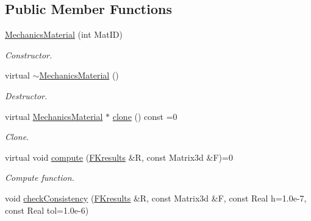 \subsection*{Public Member Functions}
\begin{DoxyCompactItemize}
\item 
\hypertarget{classvoom_1_1_mechanics_material_a8ada87cbee671983effd741dec424536}{
\hyperlink{classvoom_1_1_mechanics_material_a8ada87cbee671983effd741dec424536}{MechanicsMaterial} (int MatID)}
\label{classvoom_1_1_mechanics_material_a8ada87cbee671983effd741dec424536}

\begin{DoxyCompactList}\small\item\em Constructor. \item\end{DoxyCompactList}\item 
\hypertarget{classvoom_1_1_mechanics_material_a885bf927f6480ff577d6934c8272e832}{
virtual \hyperlink{classvoom_1_1_mechanics_material_a885bf927f6480ff577d6934c8272e832}{$\sim$MechanicsMaterial} ()}
\label{classvoom_1_1_mechanics_material_a885bf927f6480ff577d6934c8272e832}

\begin{DoxyCompactList}\small\item\em Destructor. \item\end{DoxyCompactList}\item 
\hypertarget{classvoom_1_1_mechanics_material_a443b8bae4637df4dcb049185ea272962}{
virtual \hyperlink{classvoom_1_1_mechanics_material}{MechanicsMaterial} $\ast$ \hyperlink{classvoom_1_1_mechanics_material_a443b8bae4637df4dcb049185ea272962}{clone} () const =0}
\label{classvoom_1_1_mechanics_material_a443b8bae4637df4dcb049185ea272962}

\begin{DoxyCompactList}\small\item\em Clone. \item\end{DoxyCompactList}\item 
\hypertarget{classvoom_1_1_mechanics_material_a0a78cf77ca39a636e8e2d46f4b141f48}{
virtual void \hyperlink{classvoom_1_1_mechanics_material_a0a78cf77ca39a636e8e2d46f4b141f48}{compute} (\hyperlink{structvoom_1_1_mechanics_material_1_1_f_kresults}{FKresults} \&R, const Matrix3d \&F)=0}
\label{classvoom_1_1_mechanics_material_a0a78cf77ca39a636e8e2d46f4b141f48}

\begin{DoxyCompactList}\small\item\em Compute function. \item\end{DoxyCompactList}\item 
\hypertarget{classvoom_1_1_mechanics_material_a605d5ba240e3ef64b1a30599f48db6db}{
void \hyperlink{classvoom_1_1_mechanics_material_a605d5ba240e3ef64b1a30599f48db6db}{checkConsistency} (\hyperlink{structvoom_1_1_mechanics_material_1_1_f_kresults}{FKresults} \&R, const Matrix3d \&F, const Real h=1.0e-\/7, const Real tol=1.0e-\/6)}
\label{classvoom_1_1_mechanics_material_a605d5ba240e3ef64b1a30599f48db6db}


\end{DoxyCompactItemize}
